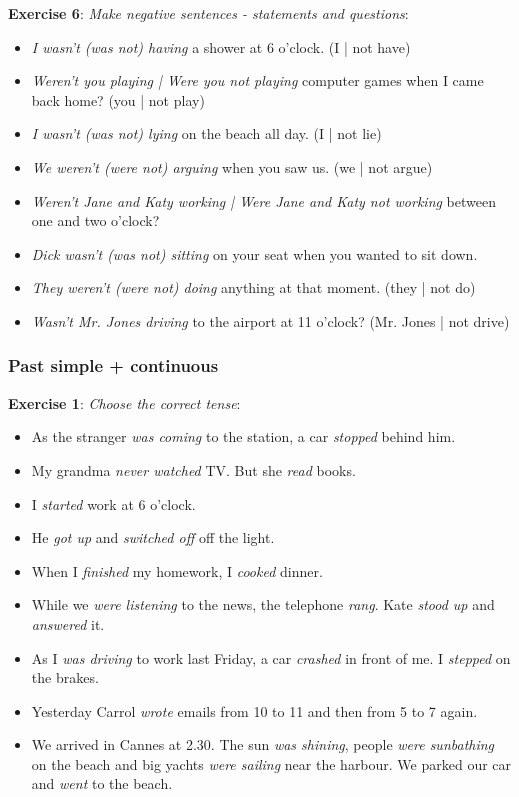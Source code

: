 \textbf{Exercise 6}: \textit{Make negative sentences - statements and questions}:

\begin{itemize}

\item \textit{I wasn't (was not) having} a shower at 6 o'clock. (I | not have)
\item \textit{Weren't you playing | Were you not playing} computer games when I came back home? (you | not play)
\item \textit{I wasn't (was not) lying} on the beach all day. (I | not lie)
\item \textit{We weren't (were not) arguing} when you saw us. (we | not argue)
\item \textit{Weren't Jane and Katy working | Were Jane and Katy not working} between one and two o'clock?
\item \textit{Dick wasn't (was not) sitting} on your seat when you wanted to sit down.
\item \textit{They weren't (were not) doing} anything at that moment. (they | not do)
\item \textit{Wasn't Mr. Jones driving} to the airport at 11 o'clock? (Mr. Jones | not drive)
\end{itemize}

\subsubsection{Past simple + continuous}

\textbf{Exercise 1}: \textit{Choose the correct tense}:

\begin{itemize}

\item As the stranger \textit{was coming} to the station, a car \textit{stopped} behind him.
\item My grandma \textit{never watched} TV. But she \textit{read} books.
\item I \textit{started} work at 6 o'clock.
\item He \textit{got up} and \textit{switched off} off the light.
\item When I \textit{finished} my homework, I \textit{cooked} dinner.
\item While we \textit{were listening} to the news, the telephone \textit{rang}. Kate \textit{stood up} and \textit{answered} it.
\item As I \textit{was driving} to work last Friday, a car \textit{crashed} in front of me. I \textit{stepped} on the brakes.
\item Yesterday Carrol \textit{wrote} emails from 10 to 11 and then from 5 to 7 again.
\item We arrived in Cannes at 2.30. The sun \textit{was shining}, people \textit{were sunbathing} on the beach and big yachts \textit{were sailing} near the harbour. We parked our car and \textit{went} to the beach.

\end{itemize}

